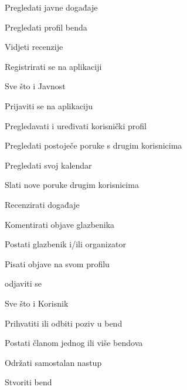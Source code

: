 		
		\begin{packed_enum}

		\item  {}
						
			\begin{packed_enum}
				\item Pregledati javne događaje
				\item Pregledati profil benda
				\item Vidjeti recenzije
				\item Registrirati se na aplikaciji
			\end{packed_enum}
					
		\item  {}
			
			\begin{packed_enum}
				
				\item Sve što i Javnost
				\item Prijaviti se na aplikaciju
				\item Pregledavati i uređivati korisnički profil
				\item Pregledati postoječe poruke s drugim korisnicima
				\item Pregledati svoj kalendar
				\item Slati nove poruke drugim korisnicima
				\item Recenzirati događaje
				\item Komentirati objave glazbenika
				\item Postati glazbenik i/ili organizator
				\item Pisati objave na svom profilu
				\item odjaviti se 
				
			\end{packed_enum}
			
			
		\item  {}
			
			\begin{packed_enum}
				
				\item Sve što i Korisnik
				\item Prihvatiti ili odbiti poziv u bend
				\item Postati članom jednog ili više bendova
				\item Održati samostalan nastup
				\item Stvoriti bend
			\end{packed_enum}
			

\end{packed_enum}
